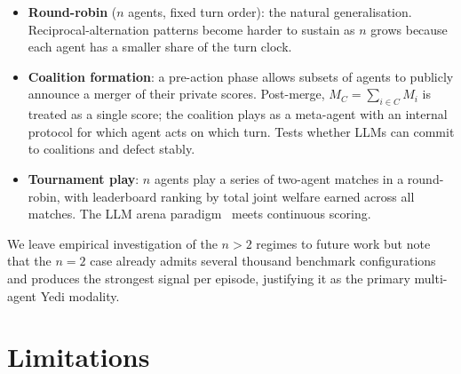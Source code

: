\documentclass[11pt]{article}
\begin{document}
\begin{itemize}
  \item \textbf{Round-robin} ($n$ agents, fixed turn order): the
    natural generalisation. Reciprocal-alternation patterns become
    harder to sustain as $n$ grows because each agent has a smaller
    share of the turn clock.
  \item \textbf{Coalition formation}: a pre-action phase allows
    subsets of agents to publicly announce a merger of their private
    scores. Post-merge, $M_C = \sum_{i \in C} M_i$ is treated as a
    single score; the coalition plays as a meta-agent with an internal
    protocol for which agent acts on which turn. Tests whether LLMs
    can commit to coalitions and defect stably.
  \item \textbf{Tournament play}: $n$ agents play a series of two-agent
    matches in a round-robin, with leaderboard ranking by total joint
    welfare earned across all matches. The LLM arena
    paradigm~\citep{chen2024llmarena} meets continuous scoring.
\end{itemize}

We leave empirical investigation of the $n > 2$ regimes to future work
but note that the $n = 2$ case already admits several thousand
benchmark configurations and produces the strongest signal per episode,
justifying it as the primary multi-agent Yedi modality.


\section{Limitations}
\label{sec:limitations}
\end{document}
